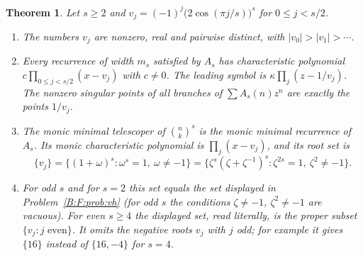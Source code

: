 \documentclass[11pt,a4paper]{article}
\newtheorem{theorem}{Theorem}[section]
\theoremstyle{definition}
\theoremstyle{remark}
\numberwithin{equation}{section}
\begin{document}
\begin{theorem}\label{B:F:thm:charpoly}
Let $s\ge2$ and $v_j=(-1)^j\bigl(2\cos(\pi j/s)\bigr)^s$ for
$0\le j<s/2$.
\begin{enumerate}
\item The numbers $v_j$ are nonzero, real and pairwise distinct, with
$|v_0|>|v_1|>\cdots$.
\item Every recurrence of width $m_s$ satisfied by $A_s$ has characteristic
polynomial $c\prod_{0\le j<s/2}(x-v_j)$ with $c\ne0$. The leading symbol is
$\kappa\prod_j(z-1/v_j)$. The nonzero singular points of all branches of
$\sum A_s(n)z^n$ are exactly the points $1/v_j$.
\item The monic minimal telescoper of $\binom nk^s$ is the monic minimal
recurrence of $A_s$. Its monic characteristic polynomial is $\prod_j(x-v_j)$, and
its root set is
\[
 \{v_j\}=\{(1+\omega)^s:\omega^s=1,\ \omega\ne-1\}
 =\{\zeta^s(\zeta+\zeta^{-1})^s:\zeta^{2s}=1,\ \zeta^2\ne-1\}.
\]
\item For odd $s$ and for $s=2$ this set equals the set displayed in
Problem~\ref{B:F:prob:vh} (for odd $s$ the conditions $\zeta\ne-1$,
$\zeta^2\ne-1$ are vacuous). For even $s\ge4$ the displayed set, read literally,
is the proper subset $\{v_j:j\text{ even}\}$. It omits the negative roots
$v_j$ with $j$ odd; for example it gives $\{16\}$ instead of $\{16,-4\}$ for
$s=4$.
\end{enumerate}
\end{theorem}
\end{document}
